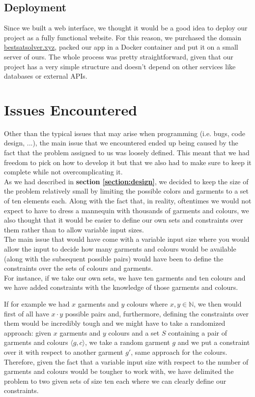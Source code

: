 \documentclass[12pt]{article}
\begin{document}
    \subsection{Deployment}
        Since we built a web interface, we thought it would be a good idea to deploy our project as a fully functional website. 
        For this reason, we purchased the domain \url{bestsatsolver.xyz}, packed our app in a Docker container and put it on a small server of ours.
        The whole process was pretty straightforward, given that our project has a very simple structure and doesn't depend on other services like databases or external APIs.

\section{Issues Encountered}
\label{section:issues}

Other than the typical issues that may arise when programming (i.e. bugs, code design, ...), the main issue that we encountered ended up being caused by the fact that the problem assigned to us was loosely defined. This meant that we had freedom to pick on how to develop it but that we also had to make sure to keep it complete while not overcomplicating it.\\

As we had described in \textbf{section \ref{section:design}}, we decided to keep the size of the problem relatively small by limiting the possible colors and garments to a set of ten elements each. Along with the fact that, in reality, oftentimes we would not expect to have to dress a mannequin with thousands of garments and colours, we also thought that it would be easier to define our own sets and constraints over them rather than to allow variable input sizes.\\

The main issue that would have come with a variable input size where you would allow the input to decide how many garments and colours would be available (along with the subsequent possible pairs) would have been to define the constraints over the sets of colours and garments.\\

For instance, if we take our own sets, we have ten garments and ten colours and we have added constraints with the knowledge of those garments and colours.

If for example we had $x$ garments and $y$ colours where $x, y \in \mathbb{N}$, we then would first of all have $x \cdot y$ possible pairs and, furthermore, defining the constraints over them would be incredibly tough and we might have to take a randomized approach: given $x$ garments and $y$ colours and a set $S$ containing a pair of garments and colours $\langle g, c \rangle$, we take a random garment $g$ and we put a constraint over it with respect to another garment $g'$, same approach for the colours.\\

Therefore, given the fact that a variable input size with respect to the number of garments and colours would be tougher to work with, we have delimited the problem to two given sets of size ten each where we can clearly define our constraints.
\end{document}
